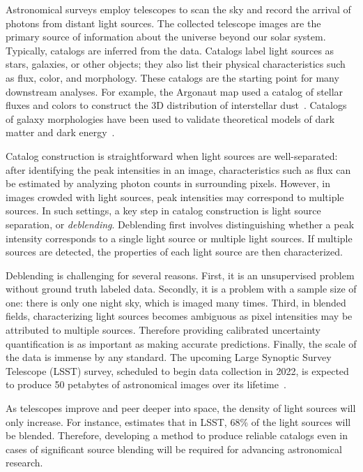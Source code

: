 Astronomical surveys employ telescopes to scan the sky and record the arrival of photons from distant light sources. 
The collected telescope images are the primary source of information about the universe beyond our solar system. 
Typically, catalogs are inferred from the data.
Catalogs label light sources as stars, galaxies, or other objects; 
they also list their physical characteristics such as flux, color, and morphology. 
These catalogs are the starting point for many downstream analyses.
For example, the Argonaut map used a catalog of stellar fluxes and colors to construct the 3D distribution of interstellar dust~\cite{Green_2019_argonaut}. 
Catalogs of galaxy morphologies have been used to validate theoretical models of dark matter and dark energy~\cite{Eisenstein_2005_darkmatter}. 

Catalog construction is straightforward when light sources are well-separated: after identifying the peak intensities in an image, characteristics such as flux can be estimated by analyzing photon counts in surrounding pixels. 
However, in images crowded with light sources, peak intensities may correspond to multiple sources.
In such settings, a key step in catalog construction is light source separation, or {\itshape deblending}. 
Deblending first involves distinguishing whether a peak intensity corresponds to a single light source or multiple light sources. 
If multiple sources are detected, the properties of each light source are then characterized. 

Deblending is challenging for several reasons.
First, it is an unsupervised problem without ground truth labeled data. 
Secondly, it is a problem with a sample size of one: there is only one night sky, which is imaged many times.
Third, in blended fields, characterizing light sources becomes ambiguous as pixel intensities may be attributed to multiple sources. Therefore providing calibrated uncertainty quantification is as important as making accurate predictions.
Finally, the scale of the data is immense by any standard. The upcoming Large Synoptic Survey Telescope (LSST) survey, scheduled to begin data collection in 2022, is expected to produce 50 petabytes of astronomical images over its lifetime~\cite{LSST_about}.

As telescopes improve and peer deeper into space, the density of light sources will only increase. 
For instance, \cite{Bosch_2017_LSST} estimates that in LSST, 68\% of the light sources will be blended. Therefore, developing a method to produce reliable catalogs even in cases of significant source blending will be required for advancing astronomical research. 

